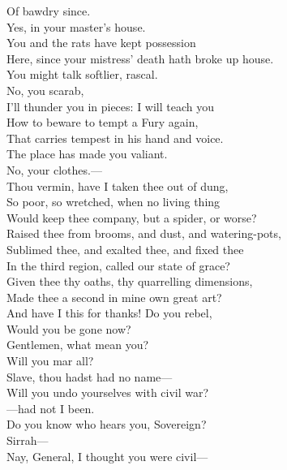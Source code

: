 \documentclass[a4paper,oneside,12pt]{memoir}
\begin{document}
\begin{drama*}
Of bawdry since.\\
\subtlespeaks {} Yes, in your master's house.\\
You and the rats have kept possession\\
Here, since your mistress' death hath broke up house.\\
\facespeaks You might talk softlier, rascal.\\
\subtlespeaks {} No, you scarab,\\
I'll thunder you in pieces: I will teach you\\
How to beware to tempt a Fury again,\\
That carries tempest in his hand and voice.\\
\facespeaks The place has made you valiant.\\
\subtlespeaks {} No, your clothes.---\\
Thou vermin, have I taken thee out of dung,\\
So poor, so wretched, when no living thing\\
Would keep thee company, but a spider, or worse?\\
Raised thee from brooms, and dust, and watering-pots,\\
Sublimed thee, and exalted thee, and fixed thee\\
In the third region, called our state of grace?\\
Given thee thy oaths, thy quarrelling dimensions,\\
Made thee a second in mine own great art?\\
And have I this for thanks! Do you rebel,\\
Would you be gone now?\\
\dolspeaks {} Gentlemen, what mean you?\\
Will you mar all?\\
\subtlespeaks {} Slave, thou hadst had no name---\\
\dolspeaks Will you undo yourselves with civil war?\\
\subtlespeaks ---had not I been.\\
\dolspeaks {} Do you know who hears you, Sovereign?\\
\facespeaks Sirrah---\\
\dolspeaks {} Nay, General, I thought you were civil---\\

\end{drama*}
\end{document}
